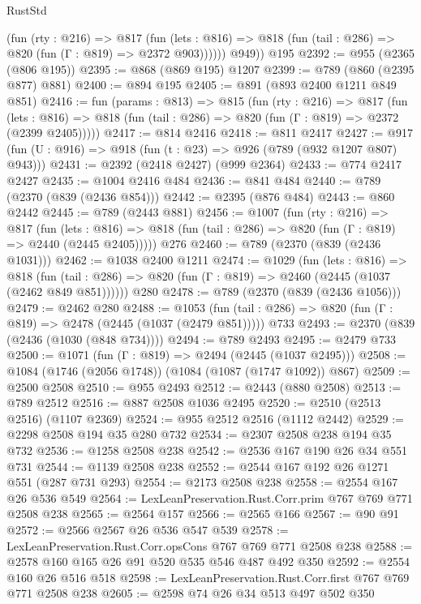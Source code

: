 \begin{lexlean}{RustStd}
\begin{coremodule}
{\begin{coremodule}
{{{{{{{            (fun (rty : @216) =>
            @817
              (fun (lets : @816) =>
              @818 (fun (tail : @286) => @820 (fun (Γ : @819) => @2372 @903))))))
        @949))
    @195
@2392 := @955 (@2365 (@806 @195))
@2395 := @868 (@869 @195) @1207
@2399 := @789 (@860 (@2395 @877) @881)
@2400 := @894 @195
@2405 := @891 (@893 @2400 @1211 @849 @851)
@2416 := fun (params : @813) =>
  @815
    (fun (rty : @216) =>
    @817
      (fun (lets : @816) =>
      @818 (fun (tail : @286) => @820 (fun (Γ : @819) => @2372 (@2399 @2405)))))
@2417 := @814 @2416
@2418 := @811 @2417
@2427 := @917 (fun (U : @916) => @918 (fun (t : @23) => @926 (@789 (@932 @1207 @807) @943)))
@2431 := @2392 (@2418 @2427) (@999 @2364)
@2433 := @774 @2417 @2427
@2435 := @1004 @2416 @484
@2436 := @841 @484
@2440 := @789 (@2370 (@839 (@2436 @854)))
@2442 := @2395 (@876 @484)
@2443 := @860 @2442
@2445 := @789 (@2443 @881)
@2456 := @1007
    (fun (rty : @216) =>
    @817
      (fun (lets : @816) =>
      @818 (fun (tail : @286) => @820 (fun (Γ : @819) => @2440 (@2445 @2405)))))
    @276
@2460 := @789 (@2370 (@839 (@2436 @1031)))
@2462 := @1038 @2400 @1211
@2474 := @1029
    (fun (lets : @816) =>
    @818 (fun (tail : @286) => @820 (fun (Γ : @819) => @2460 (@2445 (@1037 (@2462 @849 @851))))))
    @280
@2478 := @789 (@2370 (@839 (@2436 @1056)))
@2479 := @2462 @280
@2488 := @1053
    (fun (tail : @286) => @820 (fun (Γ : @819) => @2478 (@2445 (@1037 (@2479 @851)))))
    @733
@2493 := @2370 (@839 (@2436 (@1030 (@848 @734))))
@2494 := @789 @2493
@2495 := @2479 @733
@2500 := @1071 (fun (Γ : @819) => @2494 (@2445 (@1037 @2495)))
@2508 := @1084 (@1746 (@2056 @1748)) (@1084 (@1087 (@1747 @1092)) @867)
@2509 := @2500 @2508
@2510 := @955 @2493
@2512 := @2443 (@880 @2508)
@2513 := @789 @2512
@2516 := @887 @2508 @1036 @2495
@2520 := @2510 (@2513 @2516) (@1107 @2369)
@2524 := @955 @2512 @2516 (@1112 @2442)
@2529 := @2298 @2508 @194 @35 @280 @732
@2534 := @2307 @2508 @238 @194 @35 @732
@2536 := @1258 @2508 @238
@2542 := @2536 @167 @190 @26 @34 @551 @731
@2544 := @1139 @2508 @238
@2552 := @2544 @167 @192 @26 @1271 @551 (@287 @731 @293)
@2554 := @2173 @2508 @238
@2558 := @2554 @167 @26 @536 @549
@2564 := LexLeanPreservation.Rust.Corr.prim @767 @769 @771 @2508 @238
@2565 := @2564 @157
@2566 := @2565 @166
@2567 := @90 @91
@2572 := @2566 @2567 @26 @536 @547 @539
@2578 := LexLeanPreservation.Rust.Corr.opsCons @767 @769 @771 @2508 @238
@2588 := @2578 @160 @165 @26 @91 @520 @535 @546 @487 @492 @350
@2592 := @2554 @160 @26 @516 @518
@2598 := LexLeanPreservation.Rust.Corr.first @767 @769 @771 @2508 @238
@2605 := @2598 @74 @26 @34 @513 @497 @502 @350
}}}}}}}
\end{coremodule}}
\end{coremodule}
\end{lexlean}
